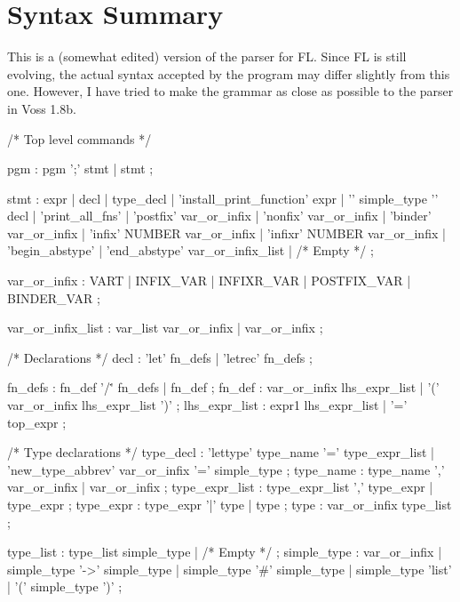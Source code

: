 \section{Syntax Summary}

This is a (somewhat edited) version of the parser for FL. Since FL
is still evolving, the actual
syntax accepted by the program may differ slightly from this one. However,
I have tried to make
the grammar as close as possible to the parser in Voss 1.8b.

\begin{hol}
/* Top level commands */

pgm             : pgm ';' stmt
                | stmt
                ;

stmt            : expr
                | decl
                | type_decl
                | 'install_print_function' expr
                | '{' simple_type '}' decl
                | 'print_all_fns'
                | 'postfix' var_or_infix
                | 'nonfix' var_or_infix
                | 'binder' var_or_infix
                | 'infix' NUMBER var_or_infix
                | 'infixr' NUMBER var_or_infix
                | 'begin_abstype'
                | 'end_abstype' var_or_infix_list
                | /* Empty */
                ;

var_or_infix    : VART 
                | INFIX_VAR
                | INFIXR_VAR
                | POSTFIX_VAR 
                | BINDER_VAR 
                ;

var_or_infix_list : var_list var_or_infix
                  | var_or_infix
                  ;
\end{hol}
\begin{hol}
/* Declarations */
decl            : 'let' fn_defs
                | 'letrec' fn_defs
                ;

fn_defs         : fn_def '/\.' fn_defs
                | fn_def
                ;
fn_def          : var_or_infix lhs_expr_list
                | '(' var_or_infix lhs_expr_list ')'
                ;
lhs_expr_list   : expr1 lhs_expr_list
                | '=' top_expr
                ;
\end{hol}
\begin{hol}
/* Type declarations */
type_decl       : 'lettype' type_name '=' type_expr_list
                | 'new_type_abbrev' var_or_infix '=' simple_type
                ;
type_name       : type_name ',' var_or_infix
                | var_or_infix
                ;
type_expr_list  : type_expr_list ',' type_expr
                | type_expr
                ;
type_expr       : type_expr '|' type
                | type
                ;
type            : var_or_infix type_list
                ;

type_list       : type_list simple_type
                | /* Empty */
                ;
simple_type     : var_or_infix
                | simple_type '->' simple_type
                | simple_type '#' simple_type
                | simple_type 'list'
                | '(' simple_type ')'
                ;
\end{hol}

